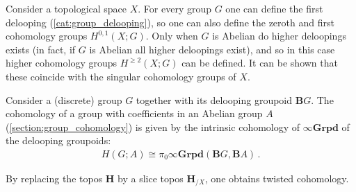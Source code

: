         \begin{example}
            Consider a topological space $X$. For every group $G$ one can define the first delooping (\cref{cat:group_delooping}), so one can also define the zeroth and first cohomology groups $H^{0,1}(X;G)$. Only when $G$ is Abelian do higher deloopings exists (in fact, if $G$ is Abelian all higher deloopings exist), and so in this case higher cohomology groups $H^{\geq 2}(X;G)$ can be defined. It can be shown that these coincide with the singular cohomology groups of $X$.
        \end{example}
    
        \begin{example}
            Consider a (discrete) group $G$ together with its delooping groupoid $\mathbf{B}G$. The cohomology of a group with coefficients in an Abelian group $A$ (\cref{section:group_cohomology}) is given by the intrinsic cohomology of $\infty\mathbf{Grpd}$ of the delooping groupoids:
            \begin{gather}
                H(G;A)\cong\pi_0\infty\mathbf{Grpd}(\mathbf{B}G,\mathbf{B}A)\,.
            \end{gather}
        \end{example}
    
        By replacing the topos $\mathbf{H}$ by a slice topos $\mathbf{H}_{/X}$, one obtains twisted cohomology.
